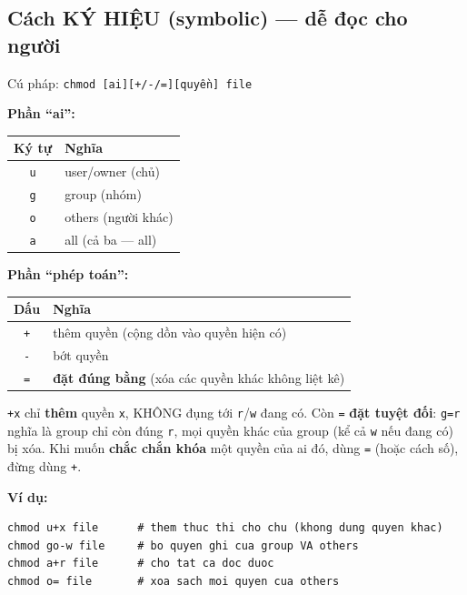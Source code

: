 \documentclass[12pt,a4paper]{article}
\newcommand{\cmd}[1]{\texttt{#1}}
\begin{document}
\subsection{Cách KÝ HIỆU (symbolic) --- dễ đọc cho người}

Cú pháp: \cmd{chmod [ai][+/-/=][quyền] file}

\textbf{Phần ``ai'':}

\begin{center}
\begin{tabular}{|c|>{\raggedright\arraybackslash}p{8cm}|}
\hline
\rowcolor{tablehead}\textbf{Ký tự} & \textbf{Nghĩa} \\
\hline
\cmd{u} & user/owner (chủ) \\
\hline
\cmd{g} & group (nhóm) \\
\hline
\cmd{o} & others (người khác) \\
\hline
\cmd{a} & all (cả ba --- all) \\
\hline
\end{tabular}
\end{center}

\textbf{Phần ``phép toán'':}

\begin{center}
\begin{tabular}{|c|>{\raggedright\arraybackslash}p{8cm}|}
\hline
\rowcolor{tablehead}\textbf{Dấu} & \textbf{Nghĩa} \\
\hline
\cmd{+} & thêm quyền (cộng dồn vào quyền hiện có) \\
\hline
\cmd{-} & bớt quyền \\
\hline
\cmd{=} & \textbf{đặt đúng bằng} (xóa các quyền khác không liệt kê) \\
\hline
\end{tabular}
\end{center}

\begin{notebox}[Phân biệt quan trọng \texttt{+} và \texttt{=}]
\cmd{+x} chỉ \textbf{thêm} quyền \cmd{x}, KHÔNG đụng tới \cmd{r}/\cmd{w} đang có. Còn
\cmd{=} \textbf{đặt tuyệt đối}: \cmd{g=r} nghĩa là group chỉ còn đúng \cmd{r}, mọi
quyền khác của group (kể cả \cmd{w} nếu đang có) bị xóa. Khi muốn \textbf{chắc chắn
khóa} một quyền của ai đó, dùng \cmd{=} (hoặc cách số), đừng dùng \cmd{+}.
\end{notebox}

\textbf{Ví dụ:}
\begin{Verbatim}
chmod u+x file      # them thuc thi cho chu (khong dung quyen khac)
chmod go-w file     # bo quyen ghi cua group VA others
chmod a+r file      # cho tat ca doc duoc
chmod o= file       # xoa sach moi quyen cua others
\end{Verbatim}
\end{document}
